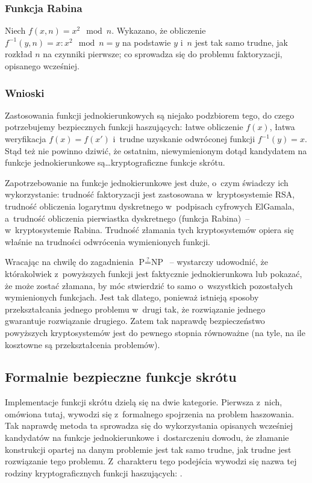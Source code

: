 \subsubsection{Funkcja Rabina}
Niech $f(x,n) = x^2 \mod n$. Wykazano, że obliczenie $f^{-1}(y,n) = x : x^2
\mod n = y$ na podstawie $y$ i~$n$ jest tak samo trudne, jak rozkład $n$ na
czynniki pierwsze; co sprowadza się do problemu faktoryzacji, opisanego
wcześniej.



\subsubsection{Wnioski}
Zastosowania funkcji jednokierunkowych są niejako podzbiorem tego, do czego
potrzebujemy bezpiecznych funkcji haszujących: łatwe obliczenie $f(x)$, łatwa
weryfikacja $f(x)=f(x')$ i~trudne uzyskanie odwróconej funkcji $f^{-1}(y)=x$.
Stąd też nie powinno dziwić, że ostatnim, niewymienionym dotąd kandydatem na
funkcje jednokierunkowe są\ldots kryptograficzne funkcje skrótu.

Zapotrzebowanie na funkcje jednokierunkowe jest duże, o~czym świadczy ich
wykorzystanie: trudność faktoryzacji jest zastosowana w~kryptosystemie RSA,
trudność obliczenia logarytmu dyskretnego w~podpisach cyfrowych ElGamala,
a~trudność obliczenia pierwiastka dyskretnego (funkcja Rabina)~--
w~kryptosystemie Rabina. Trudność złamania tych kryptosystemów opiera się
właśnie na trudności odwrócenia wymienionych funkcji.

Wracając na chwilę do zagadnienia $\textrm{P} \stackrel{?}{=} \textrm{NP}$~--
wystarczy udowodnić, że którakolwiek z~powyższych funkcji jest faktycznie
jednokierunkowa lub pokazać, że może zostać złamana, by móc stwierdzić to samo
o~wszystkich pozostałych wymienionych funkcjach. Jest tak dlatego, ponieważ
istnieją sposoby przekształcania jednego problemu w~drugi tak, że rozwiązanie
jednego gwarantuje rozwiązanie drugiego. Zatem tak naprawdę bezpieczeństwo
powyższych kryptosystemów jest do pewnego stopnia równoważne (na tyle, na ile
kosztowne są przekształcenia problemów).



\pagebreak
\subsection{Formalnie bezpieczne funkcje skrótu}
Implementacje funkcji skrótu dzielą się na dwie kategorie. Pierwsza z~nich,
omówiona tutaj, wywodzi się z~formalnego spojrzenia na problem haszowania. Tak
naprawdę metoda ta sprowadza się do wykorzystania opisanych wcześniej
kandydatów na funkcje jednokierunkowe i~dostarczeniu dowodu, że złamanie
konstrukcji opartej na danym problemie jest tak samo trudne, jak trudne jest
rozwiązanie tego problemu. Z~charakteru tego podejścia wywodzi się nazwa tej
rodziny kryptograficznych funkcji haszujących: .

